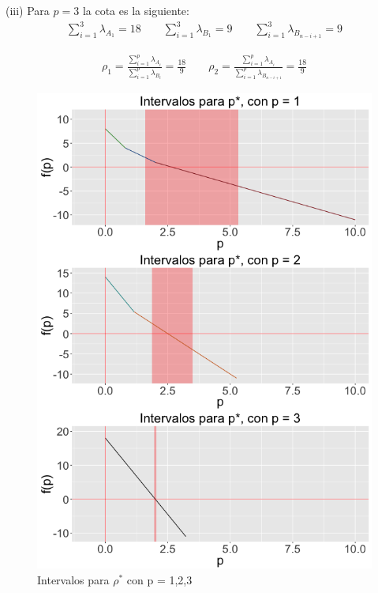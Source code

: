 \begin{example}
(iii) Para $p = 3$ la cota es la siguiente:
\begin{equation*}
  \begin{aligned}
  \sum_{i = 1}^{3}\lambda_{A_1}  = 18 \qquad
  \sum_{i = 1}^{3}\lambda_{B_1}  = 9 \qquad
  \sum_{i = 1}^{3}\lambda_{B_{n-i+1}}  = 9
  \end{aligned}
\end{equation*}

\begin{equation*}
  \begin{aligned}
\rho_1 = \frac{\sum_{i = 1}^{p}\lambda_{A_i}}{\sum_{i = 1}^{p}\lambda_{B_i}}  = \frac{18}{9} \qquad
\rho_2 = \frac{\sum_{i = 1}^{p}\lambda_{A_i}}{\sum_{i = 1}^{p}\lambda_{B_{n-i+1}}}  = \frac{18}{9}
  \end{aligned}
\end{equation*}

\end{example}
\pagebreak
\begin{figure}[!ht]
  \centering
  \includegraphics[width=1\textwidth]{Figures/Chapter2_grid3eigen_interv2}  
  \caption{Intervalos para $\rho^*$ con p = 1,2,3}
\end{figure}
\pagebreak
